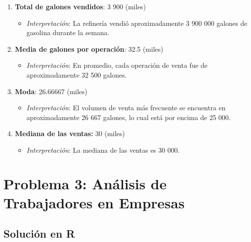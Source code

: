 \documentclass[12pt, a4paper]{article}
\begin{document}
\begin{enumerate}
    \item \textbf{Total de galones vendidos}: 3 900 (miles)
    \begin{itemize}
        \item \textit{Interpretación}: La refinería vendió aproximadamente 3 900 000 galones de gasolina durante la semana.
    \end{itemize}
    
    \item \textbf{Media de galones por operación}: 32.5 (miles)
    \begin{itemize}
        \item \textit{Interpretación}: En promedio, cada operación de venta fue de aproximadamente 32 500 galones.
    \end{itemize}
    
    \item \textbf{Moda}: 26.66667 (miles)
    \begin{itemize}
        \item \textit{Interpretación}: El volumen de venta más frecuente se encuentra en aproximadamente 26 667 galones, lo cual está por encima de 25 000.
    \end{itemize}
    \item \textbf{Mediana de las ventas:} 30 (miles)
    \begin{itemize}
        \item \textit{Interpretación}: La mediana de las ventas es 30 000.
    \end{itemize}
\end{enumerate}

\section{Problema 3: Análisis de Trabajadores en Empresas}

\subsection{Solución en R}
\end{document}
